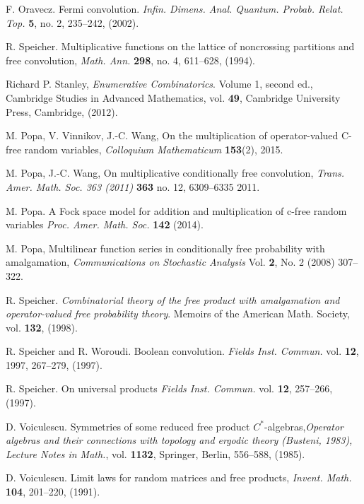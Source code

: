 \documentclass[ECP]{ejpecp} %
\begin{document}
\begin{thebibliography}{99}
 F. Oravecz. Fermi convolution. \emph{Infin. Dimens. Anal. Quantum. Probab. Relat. Top.} {\bf 5}, no. 2, 235--242, (2002).

 R. Speicher. Multiplicative functions on the lattice of noncrossing partitions
and free convolution, \emph{Math. Ann.} {\bf 298}, no. 4, 611--628, (1994).

 Richard P. Stanley, \emph{Enumerative Combinatorics}. Volume 1, second ed., Cambridge Studies in Advanced Mathematics, vol. {\bf 49}, Cambridge University
Press, Cambridge, (2012).

 M. Popa, V. Vinnikov, J.-C. Wang, On the multiplication of operator-valued C-free random variables, \emph{Colloquium Mathematicum} {\bf 153}(2), 2015.

 M. Popa, J.-C. Wang, On multiplicative conditionally free convolution, \emph{Trans. Amer. Math. Soc. 363 (2011)} {\bf 363} no. 12, 6309--6335 2011.

 M. Popa. A Fock space model for addition and multiplication of c-free random variables \emph{Proc. Amer. Math. Soc.} {\bf 142} (2014).

 M. Popa, Multilinear function series in conditionally free probability with amalgamation, \emph{Communications on Stochastic Analysis} Vol. {\bf 2}, No. 2 (2008) 307--322.

 R. Speicher. \emph{Combinatorial theory of the free product with amalgamation
and operator-valued free probability theory}. Memoirs of the American Math.
Society, vol. {\bf 132}, (1998).

 R. Speicher and R. Woroudi. Boolean convolution. \emph{Fields Inst. Commun.} vol. {\bf 12}, 1997, 267--279, (1997).

 R. Speicher. On universal products \emph{Fields Inst. Commun.} vol. {\bf 12}, 257--266, (1997).

 D. Voiculescu. Symmetries of some reduced free product $C^*$-algebras,\emph{Operator
algebras and their connections with topology and ergodic theory (Busteni,
1983), Lecture Notes in Math.}, vol. {\bf 1132}, Springer, Berlin, 556--588, (1985).


 D. Voiculescu. Limit laws for random matrices and free products, \emph{Invent. Math.} {\bf 104}, 201--220, (1991).


\end{thebibliography}
\end{document}
